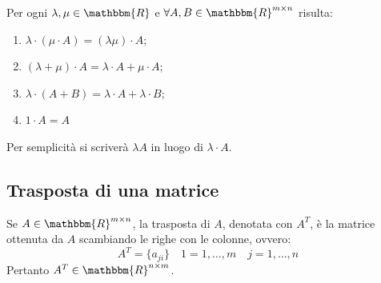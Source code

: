 \documentclass[12pt]{report}
\begin{document}
Per ogni $\lambda, \mu \in \mathbbm{R}$ e $\forall A, B \in \mathbbm{R}^{m\times n}$ risulta:
\begin{enumerate}
	\item $\lambda \cdot (\mu \cdot A) = (\lambda\mu)\cdot A$;
	\item $(\lambda + \mu)\cdot A = \lambda \cdot A + \mu \cdot A$;
	\item $\lambda \cdot (A + B) = \lambda \cdot A + \lambda \cdot B$;
	\item $1 \cdot A = A$
\end{enumerate}
Per semplicità si scriverà $\lambda A$ in luogo di $\lambda \cdot A$.
\subsection{Trasposta di una matrice}
Se $A \in \mathbbm{R}^{m\times n}$, la trasposta di $A$, denotata con $A^T$, è la matrice ottenuta da $A$ scambiando le righe con le colonne, ovvero:
\[
A^T = \{a_{ji}\} \quad 1 = 1, \dots, m \quad j = 1, \dots, n
\]
Pertanto $A^T \in \mathbbm{R}^{n\times m}$.
\end{document}
